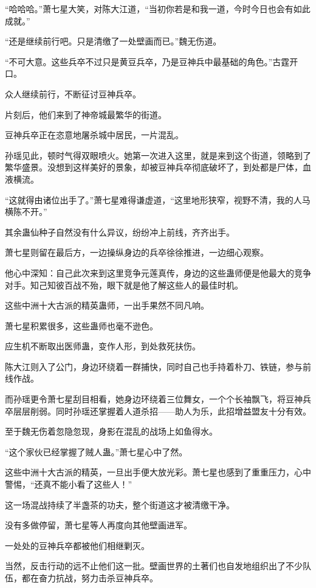 \begin{this_body}
“哈哈哈。”萧七星大笑，对陈大江道，“当初你若是和我一道，今时今日也会有如此成就。”

“还是继续前行吧。只是清缴了一处壁画而已。”魏无伤道。

“不可大意。这些兵卒不过只是黄豆兵卒，乃是豆神兵中最基础的角色。”古霆开口。

众人继续前行，不断征讨豆神兵卒。

片刻后，他们来到了神帝城最繁华的街道。

豆神兵卒正在恣意地屠杀城中居民，一片混乱。

孙瑶见此，顿时气得双眼喷火。她第一次进入这里，就是来到这个街道，领略到了繁华盛景。没想到这样美好的景象，却被豆神兵卒彻底破坏了，到处都是尸体，血液横流。

“这就得由诸位出手了。”萧七星难得谦虚道，“这里地形狭窄，视野不清，我的人马横陈不开。”

其余蛊仙种子自然没有什么异议，纷纷冲上前线，齐齐出手。

萧七星则留在最后方，一边操纵身边的兵卒徐徐推进，一边细心观察。

他心中深知：自己此次来到这里竞争元莲真传，身边的这些蛊师便是他最大的竞争对手。知己知彼百战不殆，眼下就是他了解这些人的最佳时机。

这些中洲十大古派的精英蛊师，一出手果然不同凡响。

萧七星积累很多，这些蛊师也毫不逊色。

应生机不断取出医师蛊，变作人形，到处救死扶伤。

陈大江则入了公门，身边环绕着一群捕快，同时自己也手持着朴刀、铁链，参与前线作战。

而孙瑶更令萧七星刮目相看，她身边环绕着三位舞女，一个个长袖飘飞，将豆神兵卒层层削弱。同时孙瑶还掌握着人道杀招——助人为乐，此招增益盟友十分有效。

至于魏无伤着忽隐忽现，身影在混乱的战场上如鱼得水。

“这个家伙已经掌握了贼人蛊。”萧七星心中了然。

这些中洲十大古派的精英，一旦出手便大放光彩。萧七星也感到了重重压力，心中警惕，“还真不能小看了这些人！”

这一场混战持续了半盏茶的功夫，整个街道这才被清缴干净。

没有多做停留，萧七星等人再度向其他壁画进军。

一处处的豆神兵卒都被他们相继剿灭。

当然，反击行动的远不止他们这一批。壁画世界的土著们也自发地组织出了不少队伍，都在奋力抗战，努力击杀豆神兵卒。


\end{this_body}
